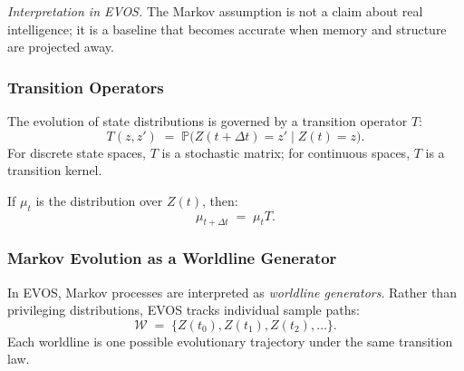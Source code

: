 \documentclass[11pt]{article}
\begin{document}
\emph{Interpretation in EVOS.} The Markov assumption is not a claim about real
intelligence; it is a baseline that becomes accurate when memory and structure are
projected away.

\subsubsection{Transition Operators}

The evolution of state distributions is governed by a transition operator $T$:
\[
T(z,z') \;=\; \mathbb{P}\!\big(Z(t+\Delta t)=z' \mid Z(t)=z\big).
\]
For discrete state spaces, $T$ is a stochastic matrix; for continuous spaces, $T$ is a
transition kernel.

If $\mu_t$ is the distribution over $Z(t)$, then:
\[
\mu_{t+\Delta t} \;=\; \mu_t T.
\]

\subsubsection{Markov Evolution as a Worldline Generator}

In EVOS, Markov processes are interpreted as \emph{worldline generators}. Rather than
privileging distributions, EVOS tracks individual sample paths:
\[
\mathcal{W} \;=\; \{Z(t_0), Z(t_1), Z(t_2), \dots \}.
\]
Each worldline is one possible evolutionary trajectory under the same transition law.
\end{document}
